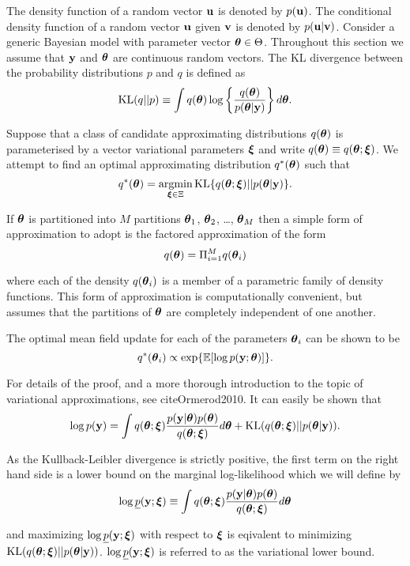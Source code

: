 The density function of a random vector ${\bf u}$ is denoted by $p({\bf u})$.  The conditional density function of a
random vector ${\bf u}$ given ${\bf v}$ is denoted by $p({\bf u}|{\bf v})$. Consider a generic Bayesian model with parameter
vector ${\boldsymbol \theta} \in \Theta$. Throughout this section we assume that ${\bf y}$ and ${\boldsymbol \theta}$ are continuous random
vectors. The KL divergence between the probability distributions $p$ and $q$ is defined as
$$
	\text{KL}(q || p) \equiv \int q({\boldsymbol \theta}) \log \left \{ \frac{q({\boldsymbol \theta})}{p({\boldsymbol \theta} | {\bf y})} \right \} d {\boldsymbol \theta}.
$$

Suppose that a class of candidate approximating distributions $q({\boldsymbol \theta})$ is parameterised by a vector
variational parameters ${\boldsymbol \xi}$ and write $q({\boldsymbol \theta})\equiv q({\boldsymbol \theta};{\boldsymbol \xi})$. We attempt to find an  optimal
approximating distribution $q^*({\boldsymbol \theta})$ such that
$$
	\ds q^*(\vtheta) = \argmin_{\vxi \in \Xi} \text{KL} \{ {q(\vtheta;\vxi) || p(\vtheta|\vy)} \}.
$$

\noindent If ${\boldsymbol \theta}$ is partitioned into $M$ partitions ${\boldsymbol \theta}_1$, ${\boldsymbol \theta}_2$, \ldots, ${\boldsymbol \theta}_M$ then a 
simple form of approximation to adopt is the factored approximation of the form
$$
	q({\boldsymbol \theta}) = \Pi_{i=1}^M q({\boldsymbol \theta}_i)
$$

\noindent where each of the density $q({\boldsymbol \theta}_i)$ is a member of a parametric family of density functions.
This form of approximation is computationally convenient, but assumes that the partitions of ${\boldsymbol \theta}$ are
completely independent of one another.

The optimal mean field update for each of the parameters ${\boldsymbol \theta}_i$ can be shown to be
$$
	q^*({\boldsymbol \theta}_i) \propto \exp \{ \mathbb{E} [\log p({\bf y}; {\boldsymbol \theta})] \}.
$$

\noindent For details of the proof, and a more thorough introduction to the topic of variational
approximations, see cite{Ormerod2010}. It can easily be shown that
$$
	\displaystyle \log p({\bf y}) = \int q({\boldsymbol \theta};{\boldsymbol \xi})\frac{p({\bf y}|{\boldsymbol \theta})p({\boldsymbol \theta})}{q({\boldsymbol \theta};{\boldsymbol \xi})} d{\boldsymbol \theta} + \text{KL}(q({\boldsymbol \theta};{\boldsymbol \xi})||p({\boldsymbol \theta}|{\bf y})).
$$

\noindent As the Kullback-Leibler divergence is strictly positive, the first term on the right hand side
is a lower bound on the marginal log-likelihood which we will define by
$$
\displaystyle \log \underline{p}({\bf y};{\boldsymbol \xi}) \equiv \int q({\boldsymbol \theta};{\boldsymbol \xi})\frac{p({\bf y}|{\boldsymbol \theta})p({\boldsymbol \theta})}{q({\boldsymbol \theta};{\boldsymbol \xi})} d{\boldsymbol \theta}
$$

\noindent and maximizing $\log \underline{p}({\bf y};{\boldsymbol \xi})$ with respect to ${\boldsymbol \xi}$ is eqivalent to minimizing
$\text{KL}(q({\boldsymbol \theta};{\boldsymbol \xi})||p({\boldsymbol \theta}|{\bf y}))$. $\log \underline{p}({\bf y};{\boldsymbol \xi})$ is referred to as the
variational lower bound.

